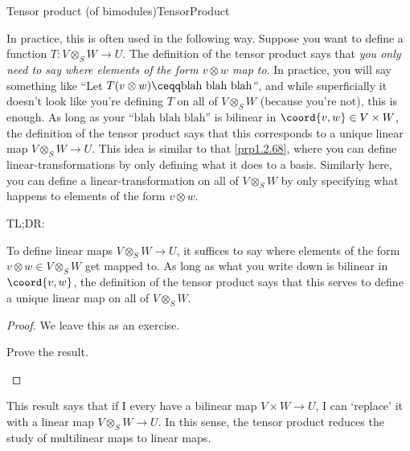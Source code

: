 \begin{thm}{Tensor product (of bimodules)}{TensorProduct}
\begin{rmk}
		In practice, this is often used in the following way.  Suppose you want to define a function $T\colon V\otimes _SW\rightarrow U$.  The definition of the tensor product says that \emph{you only need to say where elements of the form $v\otimes w$ map to}.  In practice, you will say something like ``Let $T(v\otimes w)\ceqq \text{blah blah blah}$\textellipsis'', and while superficially it doesn't look like you're defining $T$ on all of $V\otimes _SW$ (because you're not), this is enough.  As long as your ``$\text{blah blah blah}$'' is bilinear in $\coord{v,w}\in V\times W$, the definition of the tensor product says that this corresponds to a unique linear map $V\otimes _SW\rightarrow U$.  This idea is similar to that \cref{prp1.2.68}, where you can define linear-transformations by only defining what it does to a basis.  Similarly here, you can define a linear-transformation on all of $V\otimes _SW$ by only specifying what happens to elements of the form $v\otimes w$.
		
		TL;DR:
		\begin{important}
			To define linear maps $V\otimes _SW\rightarrow U$, it suffices to say where elements of the form $v\otimes w\in V\otimes _SW$ get mapped to.  As long as what you write down is bilinear in $\coord{v,w}$, the definition of the tensor product says that this serves to define a unique linear map on all of $V\otimes _SW$.
		\end{important}
	\end{rmk}
	\begin{proof}
		We leave this as an exercise.
		\begin{exr}[breakable=false]{}{}
			Prove the result.
		\end{exr}
	\end{proof}
\end{thm}
This result says that if I every have a bilinear map $V\times W\rightarrow U$, I can `replace' it with a linear map $V\otimes _SW\rightarrow U$.  In this sense, the tensor product reduces the study of multilinear maps to linear maps.


